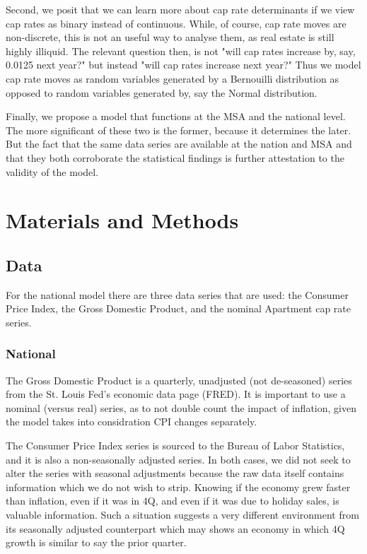 \documentclass[jrfm,article,submit,oneauthor,pdftex]{Definitions/mdpi}
\begin{document}
Second, we posit that we can learn more about cap rate determinants if we view cap rates as binary instead of continuous. While, of course, cap rate moves are non-discrete, this is not an useful way to analyse them, as real estate is still highly illiquid. The relevant question then, is not "will cap rates increase by, say,  0.0125 next year?" but instead "will cap rates increase next year?" Thus we model cap rate moves as random variables generated by a Bernouilli distribution as opposed to random variables generated by, say the Normal distribution. 

Finally, we propose a model that functions at the MSA and the national level. The more significant of these two is the former, because it determines the later. But the fact that the same data series are available at the nation and MSA and that they both corroborate the statistical findings is further attestation to the validity of the model.


\section{Materials and Methods}

\subsection{Data}
For the national model there are three data series that are used: the Consumer Price Index, the Gross Domestic Product, and the nominal Apartment cap rate series. 

\subsubsection{National}
The Gross Domestic Product is a quarterly, unadjusted (not de-seasoned) series from the St. Louis Fed's economic data page (FRED). It is important to use a nominal (versus real) series, as to not double count the impact of inflation, given the model takes into considration CPI changes separately.

The Consumer Price Index series is sourced to the Bureau of Labor Statistics, and it is also a non-seasonally adjusted series. In both cases, we did not seek to alter the series with seasonal adjustments because the raw data itself contains information which we do not wish to strip. Knowing if the economy grew faster than inflation, even if it was in 4Q, and even if it was due to holiday sales, is valuable information. Such a situation suggests a very different environment from its seasonally adjusted counterpart which may shows an economy in which 4Q growth is similar to say the prior quarter.
\end{document}
